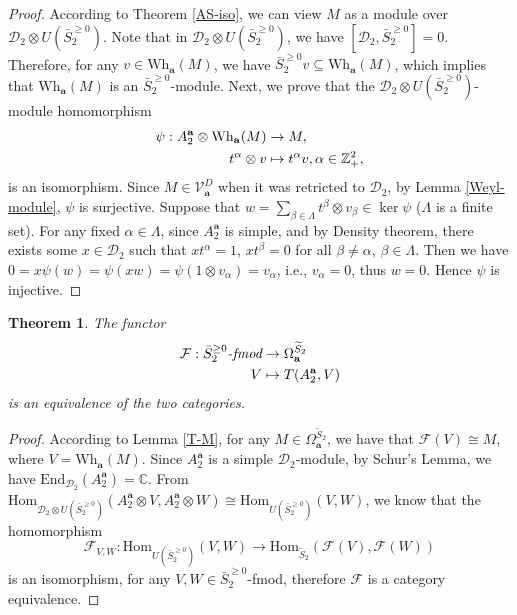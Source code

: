 \documentclass[12pt,a4paper]{amsart}
\newtheorem{Theorem}{Theorem}[section]
\def\ba{\mathbf{a}}
\def\a{\alpha}
\def\be{\beta}
\begin{document}
\begin{proof}
According to Theorem \ref{AS-iso}, we can view  $M$ as a module over $\mathcal{D}_2\otimes U(\bar{S}_2 ^{\geq 0})$.
Note that in $\mathcal{D}_2\otimes U(\bar{S}_2 ^{\geq 0})$, we have $[\mathcal{D}_2, \bar{S}_2 ^{\geq 0}]=0$. Therefore, for any $v \in \text{Wh}_{\mathbf{a}}(M)$, we have $\bar{S}_2 ^{\geq 0}v \subseteq \text{Wh}_{\mathbf{a}}(M)$,
which implies that $\text{Wh}_{\mathbf{a}}(M)$ is an $\bar{S}_2 ^{\geq 0}$-module. Next, we prove that the $\mathcal{D}_2\otimes U(\bar{S}_2 ^{\geq 0})$-module homomorphism
$$\aligned
\psi: A^{\ba}_2 \otimes \text{Wh}_{\ba}(M) &\rightarrow M,\\
t^{\a}\otimes v &\mapsto t^{\a}v, \a\in \mathbb{Z}^{2}_{+},
\endaligned$$
is an isomorphism.
Since  $M\in \mathcal{V}^{D}_\ba$ when it was retricted to $\mathcal{D}_2$,
by Lemma \ref{Weyl-module}, $\psi$ is surjective.
Suppose that $w=\sum_{\be\in \Lambda }t^{\be}\otimes v_{\be} \in \ker\psi$ ($\Lambda$ is a finite set). For any fixed $ \a\in \Lambda$, since $A^{\ba}_2$ is simple, and by Density theorem, there exists some $x\in \mathcal{D}_2$ such that $xt^{\a}=1$, $xt^{\be}=0$ for all $\be\neq \a$, $\be\in \Lambda$. Then we have $0=x \psi(w)=\psi(xw)=\psi(1\otimes v_{\a} )=v_{\a}$, i.e., $v_{\a}=0$, thus $w=0$. Hence $\psi$ is injective.
\end{proof}


\begin{Theorem}\label{cat-equ}
The functor
$$\aligned
\mathcal{F}: \bar{S}_2 ^{\geq 0}\emph{-fmod} &\rightarrow \Omega^{\widetilde{S}_2}_{\ba}\\
 V &\mapsto T(A^{\ba}_2, V)
\endaligned$$
is an equivalence of the two categories.
\end{Theorem}

\begin{proof}
 According to Lemma \ref{T-M}, for any $M\in \Omega^{\widetilde{S}_2}_{\ba}$, we have that $\mathcal{F}(V)\cong M$, where $V=\text{Wh}_{\ba}(M) $.
 Since $A^{\ba}_2$ is a simple  $\mathcal{D}_2$-module, by Schur's Lemma, we have $\text{End}_{\mathcal{D}_2}(A^{\ba}_2)=\mathbb{C}$. %
 From $\text{Hom}_{\mathcal{D}_2\otimes U(\bar{S}_2^{\geq 0})}(A^{\ba}_2\otimes V, A^{\ba}_2\otimes W)\cong \text{Hom}_{U(\bar{S}_2^{\geq 0})}(V, W)$, we know that the homomorphism $$\mathcal{F}_{V,W}:\text{Hom}_{U(\bar{S}_2^{\geq 0})}(V,W) \rightarrow \text{Hom}_{\widetilde{S}_2}(\mathcal{F}(V),\mathcal{F}(W))$$
is an isomorphism, for any $V,W\in \bar{S}_2^{\geq 0}$-fmod, therefore $\mathcal{F}$ is a category equivalence.
\end{proof}
\end{document}
